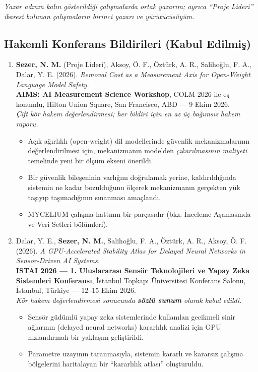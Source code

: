 \documentclass[11pt,a4paper]{article}
\begin{document}
\textit{Yazar adının kalın gösterildiği çalışmalarda ortak yazarım; ayrıca ``Proje Lideri'' ibaresi bulunan çalışmaların birinci yazarı ve yürütücüsüyüm.}

\subsection*{Hakemli Konferans Bildirileri (Kabul Edilmiş)}
\begin{enumerate}[leftmargin=*, itemsep=0.35em, topsep=2pt]
    \item \textbf{Sezer, N. M.} (Proje Lideri), Aksoy, Ö. F., Öztürk, A. R., Salihoğlu, F. A., Dalar, Y. E. (2026). \textit{Removal Cost as a Measurement Axis for Open-Weight Language Model Safety.} \\
    \textbf{AIMS: AI Measurement Science Workshop}, COLM 2026 ile eş konumlu, Hilton Union Square, San Francisco, ABD --- 9 Ekim 2026. \\
    \textit{Çift kör hakem değerlendirmesi; her bildiri için en az üç bağımsız hakem raporu.}
    \begin{itemize}
        \item Açık ağırlıklı (open-weight) dil modellerinde güvenlik mekanizmalarının değerlendirilmesi için, mekanizmanın modelden \emph{çıkarılmasının maliyeti} temelinde yeni bir ölçüm ekseni önerildi.
        \item Bir güvenlik bileşeninin varlığını doğrulamak yerine, kaldırıldığında sistemin ne kadar bozulduğunu ölçerek mekanizmanın gerçekten yük taşıyıp taşımadığının sınanması amaçlandı.
        \item MYCELIUM çalışma hattının bir parçasıdır (bkz. İnceleme Aşamasında ve Veri Setleri bölümleri).
    \end{itemize}

    \item Dalar, Y. E., \textbf{Sezer, N. M.}, Salihoğlu, F. A., Öztürk, A. R., Aksoy, Ö. F. (2026). \textit{A GPU-Accelerated Stability Atlas for Delayed Neural Networks in Sensor-Driven AI Systems.} \\
    \textbf{ISTAI 2026 --- 1. Uluslararası Sensör Teknolojileri ve Yapay Zeka Sistemleri Konferansı}, İstanbul Topkapı Üniversitesi Konferans Salonu, İstanbul, Türkiye --- 12--15 Ekim 2026. \\
    \textit{Kör hakem değerlendirmesi sonucunda \textbf{sözlü sunum} olarak kabul edildi.}
    \begin{itemize}
        \item Sensör güdümlü yapay zeka sistemlerinde kullanılan gecikmeli sinir ağlarının (delayed neural networks) kararlılık analizi için GPU hızlandırmalı bir yaklaşım geliştirildi.
        \item Parametre uzayının taranmasıyla, sistemin kararlı ve kararsız çalışma bölgelerini haritalayan bir ``kararlılık atlası'' oluşturuldu.
    \end{itemize}


\end{enumerate}
\end{document}
